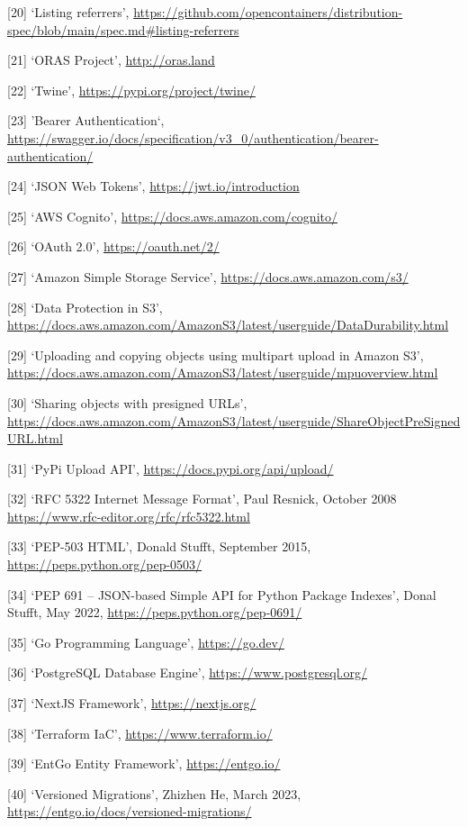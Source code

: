 \documentclass{article}
\begin{document}
  [20] `Listing referrers', \url{https://github.com/opencontainers/distribution-spec/blob/main/spec.md#listing-referrers}

  [21] `ORAS Project', \url{http://oras.land}

  [22] `Twine', \url{https://pypi.org/project/twine/}
  
  [23] 'Bearer Authentication`, \url{https://swagger.io/docs/specification/v3_0/authentication/bearer-authentication/}

  [24] `JSON Web Tokens', \url{https://jwt.io/introduction}

  [25] `AWS Cognito', \url{https://docs.aws.amazon.com/cognito/}

  [26] `OAuth 2.0', \url{https://oauth.net/2/}

  [27] `Amazon Simple Storage Service', \url{https://docs.aws.amazon.com/s3/}

  [28] `Data Protection in S3', \url{https://docs.aws.amazon.com/AmazonS3/latest/userguide/DataDurability.html}

  [29] `Uploading and copying objects using multipart upload in Amazon S3', \url{https://docs.aws.amazon.com/AmazonS3/latest/userguide/mpuoverview.html}

  [30] `Sharing objects with presigned URLs', \url{https://docs.aws.amazon.com/AmazonS3/latest/userguide/ShareObjectPreSignedURL.html}

  [31] `PyPi Upload API', \url{https://docs.pypi.org/api/upload/}

  [32] `RFC 5322 Internet Message Format', Paul Resnick, October 2008 \url{https://www.rfc-editor.org/rfc/rfc5322.html}

  [33] `PEP-503 HTML', Donald Stufft, September 2015, \url{https://peps.python.org/pep-0503/}

  [34] `PEP 691 – JSON-based Simple API for Python Package Indexes', Donal Stufft, May 2022, \url{https://peps.python.org/pep-0691/}
  
  [35] `Go Programming Language', \url{https://go.dev/}

  [36] `PostgreSQL Database Engine', \url{https://www.postgresql.org/}

  [37] `NextJS Framework', \url{https://nextjs.org/}

  [38] `Terraform IaC', \url{https://www.terraform.io/}

  [39] `EntGo Entity Framework', \url{https://entgo.io/}

  [40] `Versioned Migrations', Zhizhen He, March 2023, \url{https://entgo.io/docs/versioned-migrations/}
\end{document}
